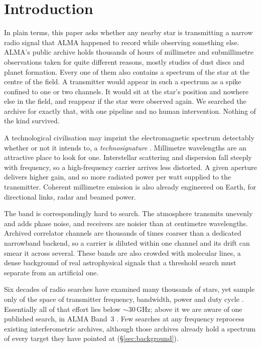\section{Introduction}
\label{sec:intro}

In plain terms, this paper asks whether any nearby star is transmitting a
narrow radio signal that ALMA happened to record while observing
something else. ALMA's public archive holds thousands of hours of
millimetre and submillimetre observations taken for quite different
reasons, mostly studies of dust discs and planet formation. Every one of
them also contains a spectrum of the star at the centre of the field. A
transmitter would appear in such a spectrum as a spike confined to one
or two channels. It would sit at the star's position and nowhere else in
the field, and reappear if the star were observed again. We searched the
archive for exactly that, with one pipeline and no human intervention. Nothing of the kind survived.

A technological civilisation may imprint the electromagnetic spectrum
detectably whether or not it intends to, a \emph{technosignature}
\citep{Sheikh2020,SETIreview2025}. Millimetre wavelengths are an
attractive place to look for one. Interstellar scattering and dispersion
fall steeply with frequency, so a high-frequency carrier arrives less
distorted. A given aperture delivers higher gain, and so more radiated
power per watt supplied to the transmitter. Coherent millimetre emission
is also already engineered on Earth, for directional links, radar and
beamed power.

The band is correspondingly hard to search. The atmosphere transmits
unevenly and adds phase noise, and receivers are noisier than at
centimetre wavelengths. Archived correlator channels are thousands of
times coarser than a dedicated narrowband backend, so a carrier is
diluted within one channel and its drift can smear it across several.
These bands are also crowded with molecular lines, a dense background of
real astrophysical signals that a threshold search must separate from an
artificial one.

Six decades of radio searches have examined many thousands of stars, yet
sample only \HaystackFrac{} of the space of transmitter frequency,
bandwidth, power and duty cycle \citep{Wright2018}. Essentially all of
that effort lies below ${\sim}30$\,GHz; above it we are aware of one
published search, in ALMA Band~3 \citep{Mason2025}. Few searches at any
frequency reprocess existing interferometric archives, although those
archives already hold a spectrum of every target they have pointed at
(\S\ref{sec:background}).

